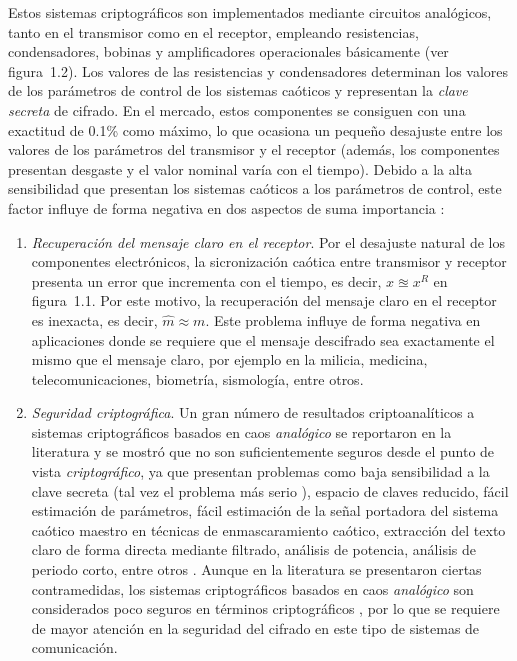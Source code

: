 Estos sistemas criptográficos son implementados mediante circuitos analógicos, tanto en el transmisor como en el receptor, empleando resistencias, condensadores, bobinas y amplificadores operacionales básicamente (ver figura~1.2). Los valores de las resistencias y condensadores determinan los valores de los parámetros de control de los sistemas caóticos y representan la \textit{clave secreta} de cifrado. En el mercado, estos componentes se consiguen con una exactitud de 0.1\% como máximo, lo que ocasiona un pequeño desajuste entre los valores de los parámetros del transmisor y el receptor (además, los componentes presentan desgaste y el valor nominal varía con el tiempo). Debido a la alta sensibilidad que presentan los sistemas caóticos a los parámetros de control, este factor influye de forma negativa en dos aspectos de suma importancia \cite{OEtAl_2012}:
\begin{enumerate}
\item \textit{Recuperación del mensaje claro en el receptor}. Por el desajuste natural de los componentes electrónicos, la sicronización caótica entre transmisor y receptor presenta un error que incrementa con el tiempo, es decir, $x \approxeq x^{R}$ en figura~1.1. Por este motivo, la recuperación del mensaje claro en el receptor es inexacta, es decir, $\widehat{m} \approx m$. Este problema influye de forma negativa en aplicaciones donde se requiere que el mensaje descifrado sea exactamente el mismo que el mensaje claro, por ejemplo en la milicia, medicina, telecomunicaciones, biometría, sismología, entre otros. 
\item  \textit{Seguridad criptográfica}. Un gran número de resultados criptoanalíticos a sistemas criptográficos basados en caos \textit{analógico} se reportaron en la literatura y se mostró que no son suficientemente seguros desde el punto de vista \textit{criptográfico}, ya que presentan problemas como baja sensibilidad a la clave secreta (tal vez el problema más serio \cite{WEtAl_2004a}), espacio de claves reducido, fácil estimación de parámetros, fácil estimación de la señal portadora del sistema caótico maestro en técnicas de enmascaramiento caótico, extracción del texto claro de forma directa mediante filtrado, análisis de potencia, análisis de periodo corto, entre otros \cite{ZEtAl_2006, LEtAl_2007, QEtAl_2009, PyL_2011}. Aunque en la literatura se presentaron ciertas contramedidas, los sistemas criptográficos basados en caos \textit{analógico} son considerados poco seguros en términos criptográficos \cite{LEtAl_2007}, por lo que se requiere de mayor atención en la seguridad del cifrado en este tipo de sistemas de comunicación. \\
\end{enumerate}

